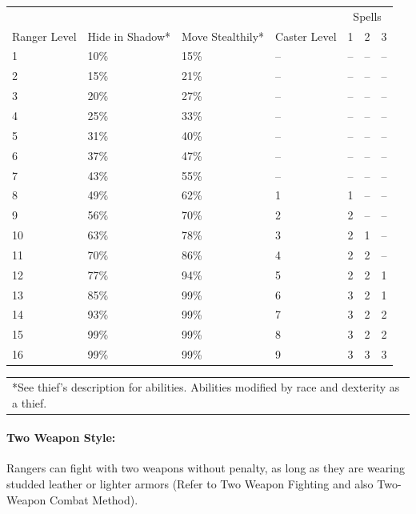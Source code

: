 \begin{multicols}{2}
\begin{minipage}{\columnwidth}
\label{rangerabilities}
\noindent
\begin{tabular}{|m{}|m{}|m{}|m{}|m{}|m{}|m{}|}
\hline
 & & & & \multicolumn{3}{c|}{Spells}\\
Ranger Level	& Hide in Shadow*	& Move Stealth\-ily*	& Caster Level	& 1	& 2	& 3 \\
\hline\hline
\rowcolor[gray]{.9}1	& 10\%	& 15\%	& --	& --	& --	& -- \\
2	& 15\%	& 21\%	& --	& --	& --	& -- \\
\rowcolor[gray]{.9}3	& 20\%	& 27\%	& --	& --	& --	& -- \\
4	& 25\%	& 33\%	& --	& --	& --	& -- \\
\rowcolor[gray]{.9}5	& 31\%	& 40\%	& --	& --	& --	& -- \\
6	& 37\%	& 47\%	& --	& --	& --	& -- \\
\rowcolor[gray]{.9}7	& 43\%	& 55\%	& --	& --	& --	& -- \\
8	& 49\%	& 62\%	& 1	& 1	& --	& -- \\
\rowcolor[gray]{.9}9	& 56\%	& 70\%	& 2	& 2	& --	& -- \\
10	& 63\%	& 78\%	& 3	& 2	& 1	& -- \\
\rowcolor[gray]{.9}11	& 70\%	& 86\%	& 4	& 2	& 2	& -- \\
12	& 77\%	& 94\%	& 5	& 2	& 2	& 1 \\
\rowcolor[gray]{.9}13	& 85\%	& 99\%	& 6	& 3	& 2	& 1 \\
14	& 93\%	& 99\%	& 7	& 3	& 2	& 2 \\
\rowcolor[gray]{.9}15	& 99\%	& 99\%	& 8	& 3	& 2	& 2 \\
16	& 99\%	& 99\%	& 9	& 3	& 3	& 3 \\
\hline
\end{tabular}
\noindent
\begin{tabular}{p{}}
*See thief's description for abilities. Abilities modified by race and dexterity as a thief. \\
\end{tabular}\vspace{.5em}

\end{minipage}

\paragraph{Two Weapon Style:} Rangers can fight with two weapons without penalty, as long as they are wearing studded leather or lighter armors (Refer to Two Weapon Fighting and also Two-Weapon Combat Method).


\end{multicols}
